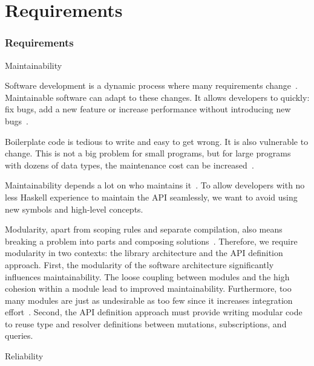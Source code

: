 \section{Requirements}
\begin{frame}\frametitle{Requirements}

\begin{alertblock}{Maintainability}  

Software development is a dynamic process where many requirements change~\cite{requirements-change-1,sof-sus-institute-maintainability}. Maintainable software can adapt to these changes. It allows developers to quickly: fix bugs, add a new feature or increase performance without introducing new bugs~\cite{view-of-web, sof-sus-institute-maintainability}.

\begin{itemize}

     Boilerplate code is tedious to write and easy to get wrong. It is also vulnerable to change. This is not a big problem for small programs, but for large programs with dozens of data types, the maintenance cost can be increased~\cite{scrap-your-boilerplate}.

     Maintainability depends a lot on who maintains it~\cite{contr-reduce-maintainability}. To allow developers with no less Haskell experience to maintain the API seamlessly, we want to avoid using new symbols and high-level concepts.

     Modularity, apart from scoping rules and separate compilation, also means breaking a problem into parts and composing solutions~\cite{history-of-haskell}. Therefore, we require modularity in two contexts: the library architecture and the API definition approach. 
    First, the modularity of the software architecture significantly influences maintainability. The loose coupling between modules and the high cohesion within a module lead to improved maintainability.  Furthermore, too many modules are just as undesirable as too few since it increases integration effort~\cite{arc-modularity}. 
    Second, the API definition approach must provide writing modular code to reuse type and resolver definitions between mutations, subscriptions, and queries. 
    
\end{itemize}

\end{alertblock}

\begin{alertblock}{Reliability}


\end{alertblock}
\end{frame}
